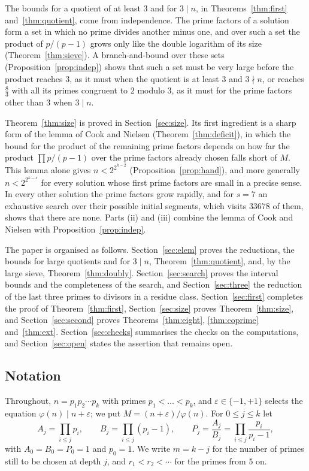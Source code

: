 \documentclass[11pt,reqno]{amsart}
\numberwithin{equation}{section}
\theoremstyle{plain}
\theoremstyle{definition}
\theoremstyle{remark}
\begin{document}
The bounds for a quotient of at least $3$ and for $3\mid n$, in
Theorems~\ref{thm:first} and~\ref{thm:quotient}, come from
independence. The prime factors of a solution form a set in which no
prime divides another minus one, and over such a set the product of
$p/(p-1)$ grows only like the double logarithm of its size
(Theorem~\ref{thm:sieve}). A branch-and-bound over these sets
(Proposition~\ref{prop:indep}) shows that such a set must be very large
before the product reaches $3$, as it must when the quotient is at
least $3$ and $3\nmid n$, or reaches $\frac83$ with all its primes
congruent to $2$ modulo $3$, as it must for the prime factors other
than $3$ when $3\mid n$.

Theorem~\ref{thm:size} is proved in Section~\ref{sec:size}. Its first
ingredient is a sharp form of the lemma of Cook and Nielsen
(Theorem~\ref{thm:deficit}), in which the bound for the product of the
remaining prime factors depends on how far the product
$\prod p/(p-1)$ over the prime factors already chosen falls short of
$M$. This lemma alone gives $n<2^{2^{k-2}}$
(Proposition~\ref{prop:hand}), and more generally $n<2^{2^{k-s}}$ for
every solution whose first prime factors are small in a precise sense.
In every other solution the prime factors grow rapidly, and for $s=7$
an exhaustive search over their possible initial segments, which visits
$33678$ of them, shows that there are none. Parts (ii) and (iii)
combine the lemma of Cook and Nielsen with Proposition~\ref{prop:indep}.

The paper is organised as follows. Section~\ref{sec:elem} proves the
reductions, the bounds for large quotients and for $3\mid n$,
Theorem~\ref{thm:quotient}, and, by the large sieve,
Theorem~\ref{thm:doubly}. Section~\ref{sec:search} proves the interval
bounds and the completeness of the search, and
Section~\ref{sec:three} the reduction of the last three primes to
divisors in a residue class. Section~\ref{sec:first} completes the
proof of Theorem~\ref{thm:first}, Section~\ref{sec:size} proves
Theorem~\ref{thm:size}, and Section~\ref{sec:second} proves
Theorems~\ref{thm:eight}, \ref{thm:coprime} and~\ref{thm:ext}.
Section~\ref{sec:checks} summarises the checks on the computations,
and Section~\ref{sec:open} states the assertion that remains open.

\subsection*{Notation}
Throughout, $n=p_1p_2\cdots p_k$ with primes $p_1<\dots<p_k$, and
$\varepsilon\in\{-1,+1\}$ selects the equation
$\varphi(n)\mid n+\varepsilon$; we put $M=(n+\varepsilon)/\varphi(n)$.
For $0\le j\le k$ let
\[
  A_j=\prod_{i\le j}p_i,\qquad B_j=\prod_{i\le j}(p_i-1),\qquad
  P_j=\frac{A_j}{B_j}=\prod_{i\le j}\frac{p_i}{p_i-1},
\]
with $A_0=B_0=P_0=1$ and $p_0=1$. We write $m=k-j$ for the number of
primes still to be chosen at depth $j$, and
$r_1<r_2<\cdots$ for the primes from $5$ on.
\end{document}
